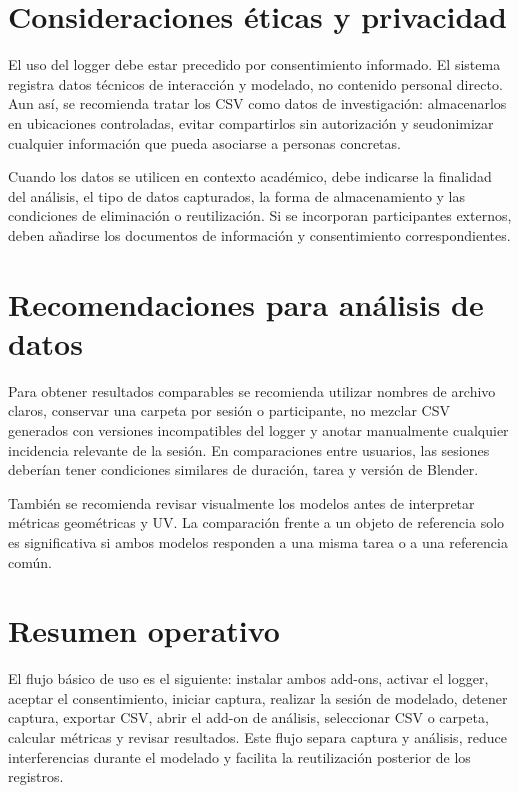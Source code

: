 \section{Consideraciones éticas y privacidad}
\label{sec:e-privacidad}

El uso del logger debe estar precedido por consentimiento informado. El sistema registra datos técnicos de interacción y modelado, no contenido personal directo. Aun así, se recomienda tratar los CSV como datos de investigación: almacenarlos en ubicaciones controladas, evitar compartirlos sin autorización y seudonimizar cualquier información que pueda asociarse a personas concretas.

Cuando los datos se utilicen en contexto académico, debe indicarse la finalidad del análisis, el tipo de datos capturados, la forma de almacenamiento y las condiciones de eliminación o reutilización. Si se incorporan participantes externos, deben añadirse los documentos de información y consentimiento correspondientes.

\section{Recomendaciones para análisis de datos}
\label{sec:e-recomendaciones}

Para obtener resultados comparables se recomienda utilizar nombres de archivo claros, conservar una carpeta por sesión o participante, no mezclar CSV generados con versiones incompatibles del logger y anotar manualmente cualquier incidencia relevante de la sesión. En comparaciones entre usuarios, las sesiones deberían tener condiciones similares de duración, tarea y versión de Blender.

También se recomienda revisar visualmente los modelos antes de interpretar métricas geométricas y UV. La comparación frente a un objeto de referencia solo es significativa si ambos modelos responden a una misma tarea o a una referencia común.

\section{Resumen operativo}
\label{sec:e-resumen-operativo}

El flujo básico de uso es el siguiente: instalar ambos add-ons, activar el logger, aceptar el consentimiento, iniciar captura, realizar la sesión de modelado, detener captura, exportar CSV, abrir el add-on de análisis, seleccionar CSV o carpeta, calcular métricas y revisar resultados. Este flujo separa captura y análisis, reduce interferencias durante el modelado y facilita la reutilización posterior de los registros.
